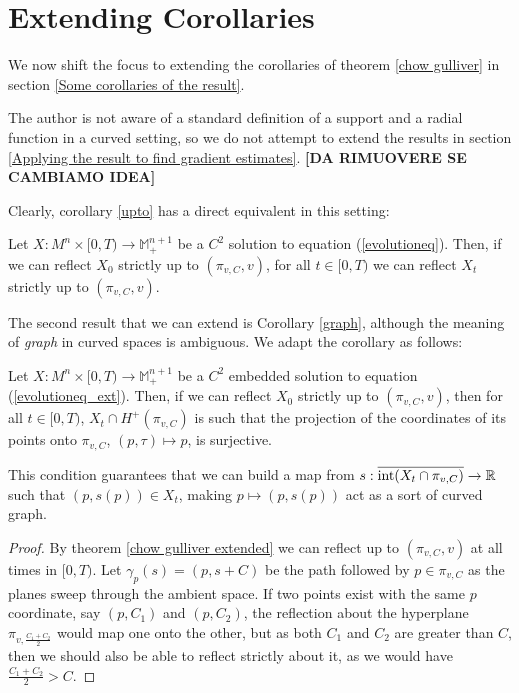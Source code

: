 \section{Extending Corollaries}

We now shift the focus to extending the corollaries of theorem \ref{chow gulliver} in section \ref{Some corollaries of the result}. 

The author is not aware of a standard definition of a support and a radial function in a curved setting, so we do not attempt to extend the results in section \ref{Applying the result to find gradient estimates}. { \textbf{[DA RIMUOVERE SE CAMBIAMO IDEA]}}

Clearly, corollary \ref{upto} has a direct equivalent in this setting:
\begin{cor}
	Let $X:M^n\times [0,T) \rightarrow \mathbb{M}^{n+1}_+$ be a $C^2$ solution to equation (\ref{evolutioneq}). Then, if we can reflect $X_0$ strictly up to $(\pi_{v,C},v)$, for all $t\in [0,T)$ we can reflect $X_t$ strictly up to $(\pi_{v,C},v)$.  
\end{cor}

The second result that we can extend is Corollary \ref{graph}, although the meaning of \textit{graph} in curved spaces is ambiguous. We adapt the corollary as follows: 


\begin{cor}
	Let $X:M^n\times [0,T) \rightarrow \mathbb{M}^{n+1}_+$ be a $C^2$ embedded solution to equation (\ref{evolutioneq_ext}). Then, if we can reflect $X_0$ strictly up to $(\pi_{v,C},v)$, then for all $t\in [0,T)$, $X_t \cap H^+(\pi_{v,C})$ is such that the projection of the coordinates of its points onto $\pi_{v,C}$, $(p, \tau)\mapsto p$, is surjective. 
\end{cor}
This condition guarantees that we can build a map from $s:\overline{\mathrm{int}(X_t \cap \pi_{v,C})}\rightarrow \mathbb{R}$ such that $(p, s(p))\in X_t$, making $p\mapsto (p, s(p))$ act as a sort of curved graph. 
\begin{proof}
	By  theorem \ref{chow gulliver extended} we can reflect up to $(\pi_{v,C},v)$ at all times in $[0,T)$. Let $\gamma_p(s)=(p, s+C)$ be the path followed by $p\in \pi_{v,C}$ as the planes sweep through the ambient space. If two points exist with the same $p$ coordinate, say $(p, C_1)$ and $(p, C_2)$, the reflection about the hyperplane $\pi_{v,\frac{ C_1 +  C_2}{2}}$ would map one onto the other, but as both $C_1$ and $C_2$ are greater than $C$, then we should also be able to reflect strictly about it, as we would have $\frac{ C_1 +  C_2}{2}>C$. 
\end{proof}

